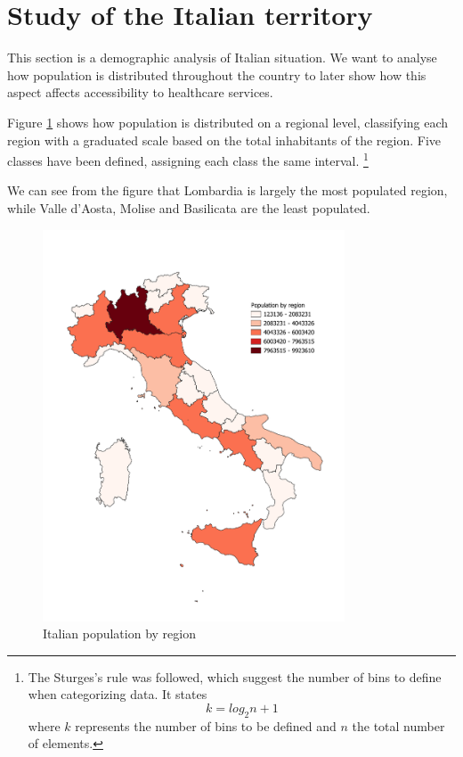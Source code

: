 \section{Study of the Italian territory}

This section is a demographic analysis of Italian situation. We want to analyse how population is distributed throughout the country to later show how this aspect affects accessibility to healthcare services.

Figure \ref{fig:pop_by_region} shows how population is distributed on a regional level, classifying each region with a graduated scale based on the total inhabitants of the region.
Five classes have been defined, assigning each class the same interval.
\footnote{The Sturges's rule was followed, which suggest the number of bins to define when categorizing data.
	It states
	\begin{equation*}
		k = log_2 n +1
	\end{equation*}
	where $k$ represents the number of bins to be defined and $n$ the total number of elements.}
	
We can see from the figure that Lombardia is largely the most populated region, while Valle d'Aosta, Molise and Basilicata are the least populated.


\begin{figure}[tbp]
	\centering
	\includegraphics[width=0.8\textwidth]{img/regioni per popolazione.pdf}
	\caption{Italian population by region}
	\label{fig:pop_by_region}
\end{figure}

